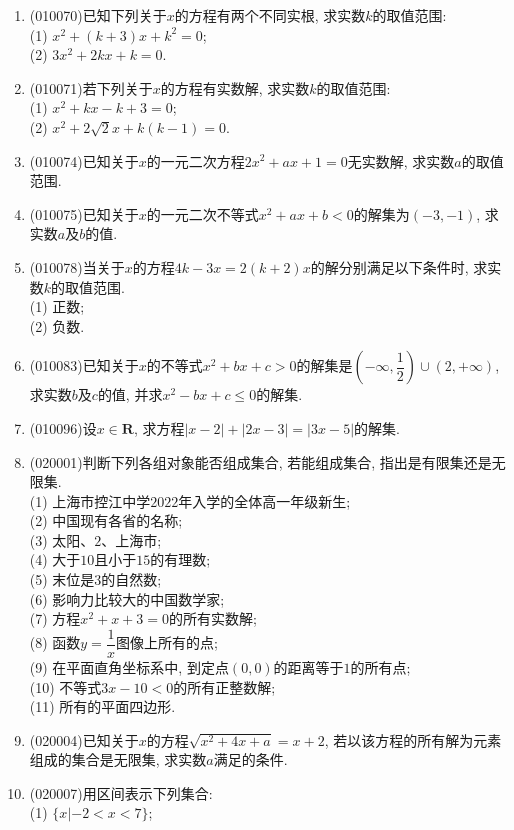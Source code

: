 \documentclass[10pt,a4paper]{article}
\begin{document}
\begin{enumerate}[1.]
\item {\tiny (010070)}已知下列关于$x$的方程有两个不同实根, 求实数$k$的取值范围:\\
(1) $x^2+(k+3)x+k^2=0$;\\
(2) $3x^2+2kx+k=0$.
\item {\tiny (010071)}若下列关于$x$的方程有实数解, 求实数$k$的取值范围:\\
(1) $x^2+kx-k+3=0$;\\
(2) $x^2+2\sqrt 2x+k(k-1)=0$.
\item {\tiny (010074)}已知关于$x$的一元二次方程$2x^2+ax+1=0$无实数解, 求实数$a$的取值范围.
\item {\tiny (010075)}已知关于$x$的一元二次不等式$x^2+ax+b<0$的解集为$(-3, -1)$, 求实数$a$及$b$的值.
\item {\tiny (010078)}当关于$x$的方程$4k-3x=2(k+2)x$的解分别满足以下条件时, 求实数$k$的取值范围.\\
(1) 正数;\\
(2) 负数.
\item {\tiny (010083)}已知关于$x$的不等式$x^2+bx+c>0$的解集是$(-\infty, \dfrac 12)\cup(2, +\infty)$, 求实数$b$及$c$的值, 并求$x^2-bx+c\le 0$的解集.
\item {\tiny (010096)}设$x\in \mathbf{R}$, 求方程$|x-2|+|2x-3|=|3x-5|$的解集.
\item {\tiny (020001)}判断下列各组对象能否组成集合, 若能组成集合, 指出是有限集还是无限集.\\
(1) 上海市控江中学$2022$年入学的全体高一年级新生;\\
(2) 中国现有各省的名称;\\
(3) 太阳、$2$、上海市;\\
(4) 大于$10$且小于$15$的有理数;\\
(5) 末位是$3$的自然数;\\
(6) 影响力比较大的中国数学家;\\
(7) 方程$x^2+x+3=0$的所有实数解;\\ 
(8) 函数$y=\dfrac 1x$图像上所有的点;\\ 
(9) 在平面直角坐标系中, 到定点$(0, 0)$的距离等于$1$的所有点;\\
(10) 不等式$3x-10<0$的所有正整数解;\\
(11) 所有的平面四边形.
\item {\tiny (020004)}已知关于$x$的方程$\sqrt {x^2+4x+a}=x+2$, 若以该方程的所有解为元素组成的集合是无限集, 求实数$a$满足的条件.
\item {\tiny (020007)}用区间表示下列集合:\\
(1) $\{x|-2<x<7\}$;\\

\end{enumerate}
\end{document}
